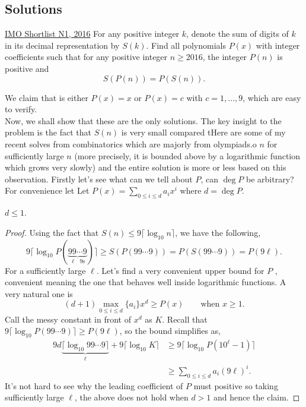 \subsection{Solutions}
\begin{problem}{1}{\href{https://artofproblemsolving.com/community/c6h1480723p34885693}{IMO Shortlist N1, 2016}}	
	For any positive integer $k$, denote the sum of digits of $k$ in its decimal representation by $S(k)$. Find all polynomials $P(x)$ with integer coefficients such that for any positive integer $n \geq 2016$, the integer $P(n)$ is positive and$$S(P(n)) = P(S(n)).$$
	\begin{solution} We claim that is either $P(x)=x$ or $P(x)=c$ with $c=1,\ldots, 9$, which are easy to verify.\\
	\indent Now, we shall show that these are the only solutions. The key insight to the problem is the fact that $S(n)$ is very small compared t\noindent Here are some of my recent solves from combinatorics which are majorly from olympiads.o $n$ for sufficiently large $n$ (more precisely, it is bounded above by a logarithmic function which grows very slowly) and the entire solution is more or less based on this observation. Firstly let's see what can we tell about $P$, can $\deg P$ be arbitrary? For convenience let Let $P(x)=\sum_{0\le i\le d}a_ix^i$ where $d=\deg P$.
	\begin{numclaim}{1}
		$d\le 1$.
	\end{numclaim}
	\begin{proof} Using the fact that $S(n)\le 9\lceil \log_{10}n\rceil$, we have the following,
$$9\lceil \log_{10}P(\underbrace{99\cdots9}_{\text{$\ell$ $9$s}})\rceil\ge S(P(99\cdots 9))=P(S(99\cdots 9))=P(9\ell).$$For a sufficiently large $\ell$. Let's find a very convenient upper bound for $P$ , convenient meaning the one that behaves well inside logarithmic functions. A very natural one is
$$(d+1)\max_{0\le i\le d}\{a_i\}x^d\ge P(x)\qquad\text{when $x\ge 1$}.$$Call the messy constant in front of $x^d$ as $K$. Recall that $9\lceil \log_{10}P(99\cdots 9)\rceil\ge P(9\ell)$, so the bound simplifies as,
\begin{align*}
 9d\underbrace{\lceil \log_{10}99\cdots 9\rceil}_{\text{$\ell$}}+ 9\lceil \log_{10}K\rceil & \ge 9\lceil \log_{10}P(10^{\ell}-1)\rceil\\
& \ge \sum_{0\le i\le d}a_i(9\ell)^i.
\end{align*}It's not hard to see why the leading coefficient of $P$ must positive so taking sufficiently large $\ell$, the above does not hold when $d>1$ and hence the claim.
	\end{proof}


\end{solution}
\end{problem}
